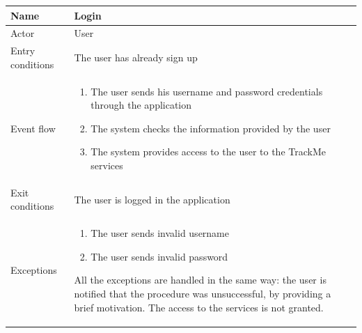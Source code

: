 \begin{table}[H]
\begin{tabularx}{\textwidth}{|l|X|}
\hline
 Name & Login \\ \hline
 Actor & User \\ \hline
 Entry conditions & The user has already sign up \\ \hline
 Event flow & 
 \begin{enumerate}
 	\item The user sends his username and password credentials through the application
  	\item The system checks the information provided by the user
 	\item The system provides access to the user to the TrackMe services
 \end{enumerate}   \\ \hline
 Exit conditions & The user is logged in the application \\ \hline
 Exceptions &  
 \begin{enumerate}
 	\item The user sends invalid username
 	\item The user sends invalid password 
 \end{enumerate}
 All the exceptions are handled in the same way: the user is notified that the procedure was unsuccessful, by providing a brief motivation. The access to the services is not granted. 
 \\ \hline
\end{tabularx}
\end{table}